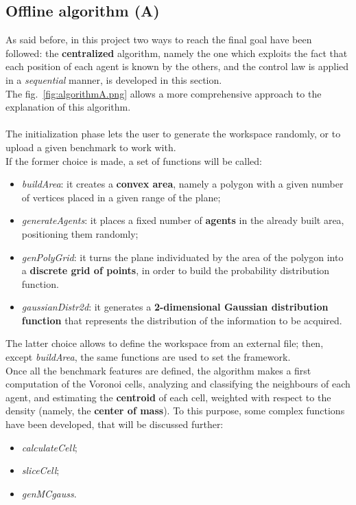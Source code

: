 \documentclass[a4paper,11pt,oneside]{book}
\begin{document}
	\subsection{Offline algorithm (A)}
	
	As said before, in this project two ways to reach the final goal have been followed: the \textbf{centralized} algorithm, namely the one which exploits the fact that each position of each agent is known by the others, and the control law is applied in a \textit{sequential} manner, is developed in this section.\\
The fig.~\ref{fig:algorithmA.png} allows a more comprehensive approach to the explanation of this algorithm.\\\\
The initialization phase lets the user to generate the workspace randomly, or to upload a given benchmark to work with. \\
If the former choice is made, a set of functions will be called:
 \begin{itemize}
		\item \textit{buildArea}: it creates a \textbf{convex area}, namely a polygon with a given number of vertices placed in a given range of the plane;
		\item \textit{generateAgents}: it places a fixed number of \textbf{agents} in the already built area, positioning them randomly;
		\item \textit{genPolyGrid}: it turns the plane individuated by the area of the polygon into a \textbf{discrete grid of points}, in order to build the probability distribution function.  
		\item \textit{gaussianDistr2d}: it generates a \textbf{2-dimensional Gaussian distribution function} that represents the distribution of the information to be acquired. 
\end {itemize}
The latter choice allows to define the workspace from an external file; then, except \textit{buildArea}, the same functions are used to set the framework.\\

Once all the benchmark features are defined, the algorithm makes a first computation of the Voronoi cells, analyzing and classifying the neighbours of each agent, and estimating the \textbf{centroid} of each cell, weighted with respect to the density (namely, the \textbf{center of mass}). To this purpose, some complex functions have been developed, that will be discussed further:
\begin{itemize}
	\item \textit{calculateCell};
	\item \textit{sliceCell};
	\item \textit{genMCgauss}.
\end{itemize}
\end{document}
